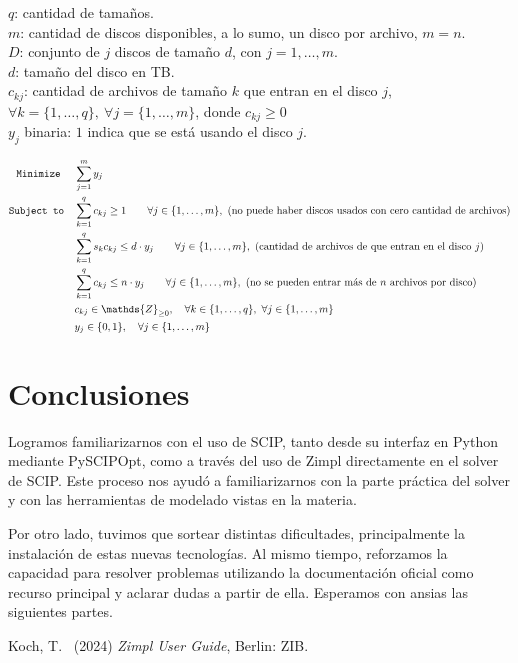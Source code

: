 \documentclass[11pt, a4paper, pdftex]{article}
\begin{document}
$q$: cantidad de tamaños. \\

$m$: cantidad de discos disponibles, a lo sumo, un disco por archivo, $m = n$. \\

$D$: conjunto de $j$ discos de tamaño $d$, con $j = 1, \ldots, m$. \\

$d$: tamaño del disco en TB. \\ 

$c_{kj}$: cantidad de archivos de tamaño $k$ que entran en el disco $j$, $\forall k = \{1, \ldots, q\},\ \forall j = \{1, \ldots, m\}$, donde $c_{kj} \ge 0$\\

$y_{j}$ binaria: $1$ indica que se está usando el disco $j$.

\begin{alignat*}{2}
	\minimize
	& \sum_{j = 1}^{m} y_{j}\\
	\subjto
	& \sum_{k = 1}^{q} c_{kj} \ge 1 \qquad \forall j \in \{1, \ldots, m\},\ \text{(no puede haber discos usados con cero cantidad de archivos)}\\
	& \sum_{k = 1}^{q} s_{k} c_{kj} \le d\cdot y_{j} \qquad \forall j \in \{1, \ldots, m\},\ \text{(cantidad de archivos de que entran en el disco $j$)}\\
	& \sum_{k = 1}^{q} c_{kj} \le n\cdot y_{j} \qquad \forall j \in \{1, \ldots, m\},\ \text{(no se pueden entrar más de $n$ archivos por disco)}\\
	& c_{kj} \in \mathds{Z}_{\ge 0}, \quad \forall k \in \{1, \ldots, q\}, \ \forall j \in \{1, \ldots, m\}\\
	& y_{j} \in \{0,1\}, \quad \forall j \in \{1, \ldots, m\}
\end{alignat*}

\section{Conclusiones}

Logramos familiarizarnos con el uso de SCIP, tanto desde su interfaz en
Python mediante PySCIPOpt, como a través del uso de Zimpl directamente
en el solver de SCIP. Este proceso nos ayudó a familiarizarnos con la
parte práctica del solver y con las herramientas de modelado vistas en
la materia.

Por otro lado, tuvimos que sortear distintas dificultades,
principalmente la instalación de estas nuevas tecnologías. Al mismo
tiempo, reforzamos la capacidad para resolver problemas utilizando la
documentación oficial como recurso principal y aclarar dudas a partir de
ella. Esperamos con ansias las siguientes partes.

\begin{thebibliography}{99}
	Koch, T.\
	(2024)
	\emph{Zimpl User Guide},
	Berlin: ZIB.
\end{thebibliography}
\end{document}
